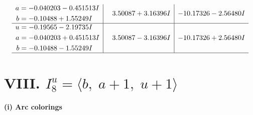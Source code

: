 \documentclass[1p]{elsarticle_modified}
\theoremstyle{definition}
\begin{document}
$$\begin{array}{c|c|c}
\begin{aligned}
a &= -0.040203 - 0.451513 I \\
b &= -0.10488 + 1.55249 I\end{aligned}
 & \phantom{-}3.50087 + 3.16396 I & -10.17326 - 2.56480 I \\ \hline\begin{aligned}
u &= -0.19565 - 2.19735 I \\
a &= -0.040203 + 0.451513 I \\
b &= -0.10488 - 1.55249 I\end{aligned}
 & \phantom{-}3.50087 - 3.16396 I & -10.17326 + 2.56480 I\\
 \hline 
 \end{array}$$\newpage\newpage\renewcommand{\arraystretch}{1}
\centering \section*{VIII. $I^u_{8}= \langle b,\;a+1,\;u+1 \rangle$}
\flushleft \textbf{(i) Arc colorings}\\
\end{document}
